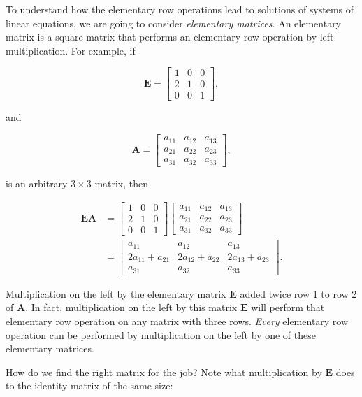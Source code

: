 \documentclass[
]{book}
\theoremstyle{definition}
\theoremstyle{definition}
\theoremstyle{definition}
\theoremstyle{definition}
\theoremstyle{remark}
\begin{document}
To understand how the elementary row operations lead to solutions of systems of linear equations, we are going to consider \emph{elementary matrices}. An elementary matrix is a square matrix that performs an elementary row operation by left multiplication. For example, if

\[\mathbf{E}=\begin{bmatrix} 1 & 0 & 0\\2 & 1 & 0\\0 & 0 & 1\end{bmatrix},\]

and

\[\mathbf{A}=\begin{bmatrix} a_{11} & a_{12} & a_{13}\\a_{21} & a_{22} & a_{23}\\ a_{31} & a_{32} & a_{33}\end{bmatrix},\]

is an arbitrary \(3\times 3\) matrix, then

\begin{align*}
\mathbf{E}\mathbf{A}&=\begin{bmatrix} 1 & 0 & 0\\2 & 1 & 0\\0 & 0 & 1\end{bmatrix}\begin{bmatrix} a_{11} & a_{12} & a_{13}\\a_{21} & a_{22} & a_{23}\\ a_{31} & a_{32} & a_{33}\end{bmatrix}\\
&=\begin{bmatrix}  a_{11} & a_{12} & a_{13}\\2a_{11}+a_{21} & 2a_{12}+a_{22} & 2a_{13}+a_{23}\\ a_{31} & a_{32} & a_{33}\end{bmatrix}.
\end{align*}

Multiplication on the left by the elementary matrix \(\mathbf{E}\) added twice row 1 to row 2 of \(\mathbf{A}.\) In fact, multiplication on the left by this matrix \(\mathbf{E}\) will perform that elementary row operation on any matrix with three rows. \emph{Every} elementary row operation can be performed by multiplication on the left by one of these elementary matrices.

How do we find the right matrix for the job? Note what multiplication by \(\mathbf{E}\) does to the identity matrix of the same size:
\end{document}
